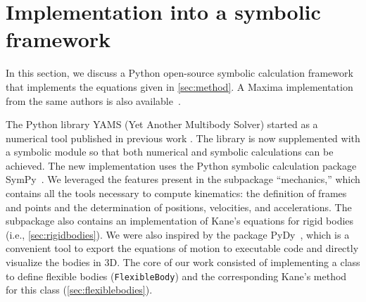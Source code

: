 \documentclass[wes, manuscript]{copernicus}
\begin{document}
\section{Implementation into a symbolic framework}
\label{sec:implementation}
In this section, we discuss a Python open-source symbolic calculation framework that implements the equations given in \autoref{sec:method}. 
A Maxima implementation from the same authors is also available~\cite{CADynTurb}.

The Python library YAMS (Yet Another Multibody Solver) started as a numerical tool published in previous work \citep{branlard:2019flex}.
The library is now supplemented with a symbolic module so that both numerical and symbolic calculations can be achieved.
The new implementation uses the Python symbolic calculation package SymPy~\citep{sympy}.
We leveraged the features present in the subpackage ``mechanics,'' which contains all the tools necessary to compute kinematics: the definition of frames and points and the determination of positions, velocities, and accelerations. The subpackage also contains an implementation of Kane's equations for rigid bodies (i.e., \autoref{sec:rigidbodies}).
We were also inspired by the package PyDy~\citep{Gede:2013}, which is a convenient tool to export the equations of motion to executable code and directly visualize the bodies in 3D.
The core of our work consisted of implementing a class to define flexible bodies (\texttt{FlexibleBody}) and the corresponding Kane's method for this class (\autoref{sec:flexiblebodies}).  
\end{document}
